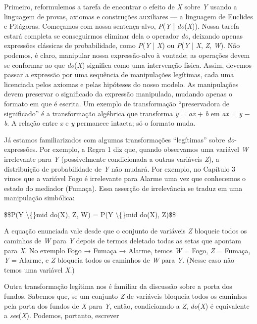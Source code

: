 \documentclass[11pt,a5paper,twoside]{book}
\begin{document}
Primeiro, reformulemos a tarefa de encontrar o efeito de \textit{X} sobre \textit{Y} usando a linguagem de provas, axiomas e construções auxiliares — a linguagem de Euclides e Pitágoras. Começamos com nossa sentença-alvo, \textit{P}(\textit{Y} | \textit{do}(\textit{X})). Nossa tarefa estará completa se conseguirmos eliminar dela o operador \textit{do}, deixando apenas expressões clássicas de probabilidade, como \textit{P}(\textit{Y} | \textit{X}) ou \textit{P}(\textit{Y} | \textit{X}, \textit{Z}, \textit{W}). Não podemos, é claro, manipular nossa expressão-alvo à vontade; as operações devem se conformar ao que \textit{do}(\textit{X}) significa como uma intervenção física. Assim, devemos passar a expressão por uma sequência de manipulações legítimas, cada uma licenciada pelos axiomas e pelas hipóteses do nosso modelo. As manipulações devem preservar o significado da expressão manipulada, mudando apenas o formato em que é escrita. Um exemplo de transformação “preservadora de significado” é a transformação algébrica que transforma \textit{y} = \textit{ax} + \textit{b} em \textit{ax} = \textit{y} − \textit{b}. A relação entre \textit{x} e \textit{y} permanece intacta; só o formato muda.

Já estamos familiarizados com algumas transformações “legítimas” sobre \textit{do}-expressões. Por exemplo, a Regra 1 diz que, quando observamos uma variável \textit{W} irrelevante para \textit{Y} (possivelmente condicionada a outras variáveis \textit{Z}), a distribuição de probabilidade de \textit{Y} não mudará. Por exemplo, no Capítulo 3 vimos que a variável Fogo é irrelevante para Alarme uma vez que conhecemos o estado do mediador (Fumaça). Essa asserção de irrelevância se traduz em uma manipulação simbólica:

\$\$P(Y \textbackslash\{\}mid do(X), Z, W) = P(Y \textbackslash\{\}mid do(X), Z)\$\$

A equação enunciada vale desde que o conjunto de variáveis \textit{Z} bloqueie todos os caminhos de \textit{W} para \textit{Y} depois de termos deletado todas as setas que apontam para \textit{X}. No exemplo Fogo → Fumaça → Alarme, temos \textit{W} = Fogo, \textit{Z} = Fumaça, \textit{Y} = Alarme, e \textit{Z} bloqueia todos os caminhos de \textit{W} para \textit{Y}. (Nesse caso não temos uma variável \textit{X}.)

Outra transformação legítima nos é familiar da discussão sobre a porta dos fundos. Sabemos que, se um conjunto \textit{Z} de variáveis bloqueia todos os caminhos pela porta dos fundos de \textit{X} para \textit{Y}, então, condicionado a \textit{Z}, \textit{do}(\textit{X}) é equivalente a \textit{see}(\textit{X}). Podemos, portanto, escrever
\end{document}
